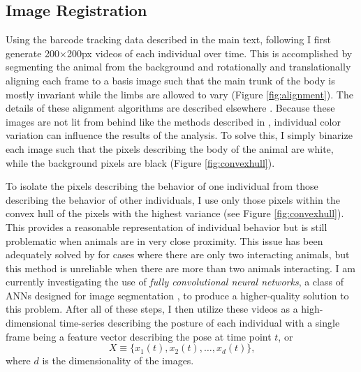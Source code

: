 \documentclass[11pt,a4paper,oneside]{article}
\begin{document}
\begin{appendices}
\section{Image Registration} \label{sec:imageregistration}
Using the barcode tracking data described in the main text, following \citet{berman2014mapping,berman2014drosopholid} I first generate 200$\times$200px videos of each individual over time. This is accomplished by segmenting the animal from the background and rotationally and translationally aligning each frame to a basis image such that the main trunk of the body is mostly invariant while the limbs are allowed to vary (Figure \ref{fig:alignment}). The details of these alignment algorithms are described elsewhere \citep{berman2014drosopholid,berman2014mapping,de1987registration,reddy1996fft,wilson2006correlation,guizar2008efficient}. Because these images are not lit from behind like the methods described in \citet{berman2014drosopholid,berman2014mapping}, individual color variation can influence the results of the analysis. To solve this, I simply binarize each image such that the pixels describing the body of the animal are white, while the background pixels are black (Figure \ref{fig:convexhull}). 
\par To isolate the pixels describing the behavior of one individual from those describing the behavior of other individuals, I use only those pixels within the convex hull of the pixels with the highest variance (see Figure \ref{fig:convexhull}). This provides a reasonable representation of individual behavior but is still problematic when animals are in very close proximity. This issue has been adequately solved by \citet{klibaite2017unsupervised} for cases where there are only two interacting animals, but this method is unreliable when there are more than two animals interacting. I am currently investigating the use of \textit{fully convolutional neural networks}, a class of ANNs designed for image segmentation \citep{long2015fully}, to produce a higher-quality solution to this problem. After all of these steps, I then utilize these videos as a high-dimensional time-series describing the posture of each individual with a single frame being a feature vector describing the pose at time point $t$, or 
\begin{equation}
X \equiv \{x_1(t),x_2(t),\ldots,x_d(t)\} \text{,}
\end{equation}
where $d$ is the dimensionality of the images. 



\end{appendices}
\end{document}
